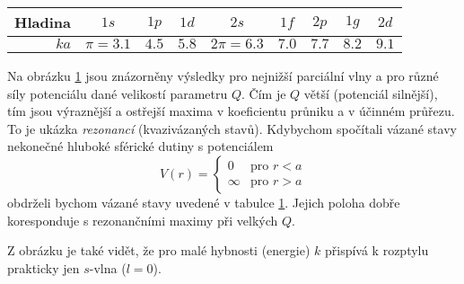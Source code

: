 \begin{solution}
\begin{figure}[!hbp]
            \label{fig:DeltaShellPotential}
		\end{figure}

		\begin{table}[!htbp]
			\centering
			\begin{tabular}{|r||c|c|c|c|c|c|c|c|}
				\hline
					Hladina & $1s$ & $1p$ & $1d$ & $2s$ & $1f$ & $2p$ & $1g$ & $2d$ \\
				\hline
					$ka$ & $\pi=3.1$ & $4.5$ & $5.8$ & $2\pi=6.3$ & $7.0$ & $7.7$ & $8.2$ & $9.1$\\
				\hline
			\end{tabular}
            \label{tab:SphericalWellLevels}
		\end{table}


		Na obrázku \ref{fig:DeltaShellPotential} jsou znázorněny výsledky pro nejnižší parciální vlny 
		a pro různé síly potenciálu dané velikostí parametru $Q$.
		Čím je $Q$ větší (potenciál silnější), tím jsou výraznější a ostřejší maxima v koeficientu průniku
		a v účinném průřezu. 
		To je ukázka \emph{rezonancí} (kvazivázaných stavů).
		Kdybychom spočítali vázané stavy nekonečné hluboké sférické dutiny s potenciálem
		\begin{equation}
			V(r)=\begin{cases}
				0 & \text{pro } r<a\\
				\infty & \text{pro } r>a
				\end{cases}
		\end{equation}
		obdrželi bychom vázané stavy uvedené v tabulce \ref{tab:SphericalWellLevels}.
		Jejich poloha dobře koresponduje s rezonančními maximy při velkých $Q$.
		
		Z obrázku je také vidět, že pro malé hybnosti (energie) $k$ přispívá k rozptylu	prakticky jen $s$-vlna ($l=0$).
	\end{solution}
